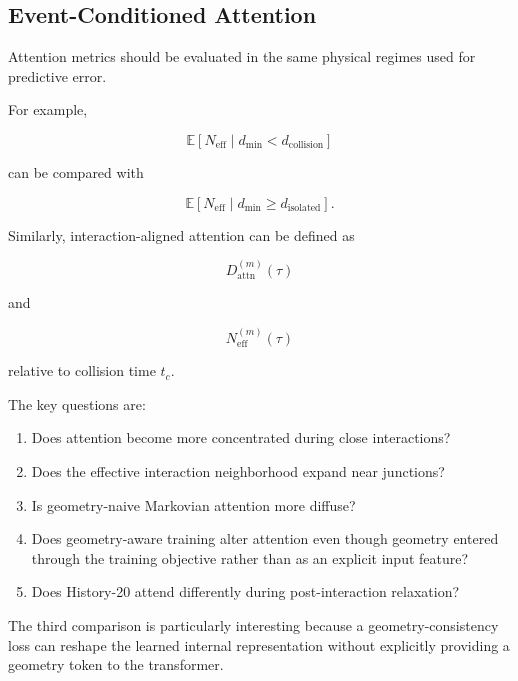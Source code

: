 \documentclass[11pt]{article}
\begin{document}
\subsection{Event-Conditioned Attention}

Attention metrics should be evaluated in the same physical regimes used for predictive error.

For example,

\begin{equation}
\mathbb{E}
\left[
N_{\mathrm{eff}}
\mid
d_{\min}<d_{\mathrm{collision}}
\right]
\end{equation}

can be compared with

\begin{equation}
\mathbb{E}
\left[
N_{\mathrm{eff}}
\mid
d_{\min}\ge d_{\mathrm{isolated}}
\right].
\end{equation}

Similarly, interaction-aligned attention can be defined as

\begin{equation}
D_{\mathrm{attn}}^{(m)}(\tau)
\end{equation}

and

\begin{equation}
N_{\mathrm{eff}}^{(m)}(\tau)
\end{equation}

relative to collision time \(t_c\).

The key questions are:

\begin{enumerate}
    \item Does attention become more concentrated during close interactions?
    \item Does the effective interaction neighborhood expand near junctions?
    \item Is geometry-naive Markovian attention more diffuse?
    \item Does geometry-aware training alter attention even though geometry entered through the training objective rather than as an explicit input feature?
    \item Does History-20 attend differently during post-interaction relaxation?
\end{enumerate}

The third comparison is particularly interesting because a geometry-consistency loss can reshape the learned internal representation without explicitly providing a geometry token to the transformer.
\end{document}
